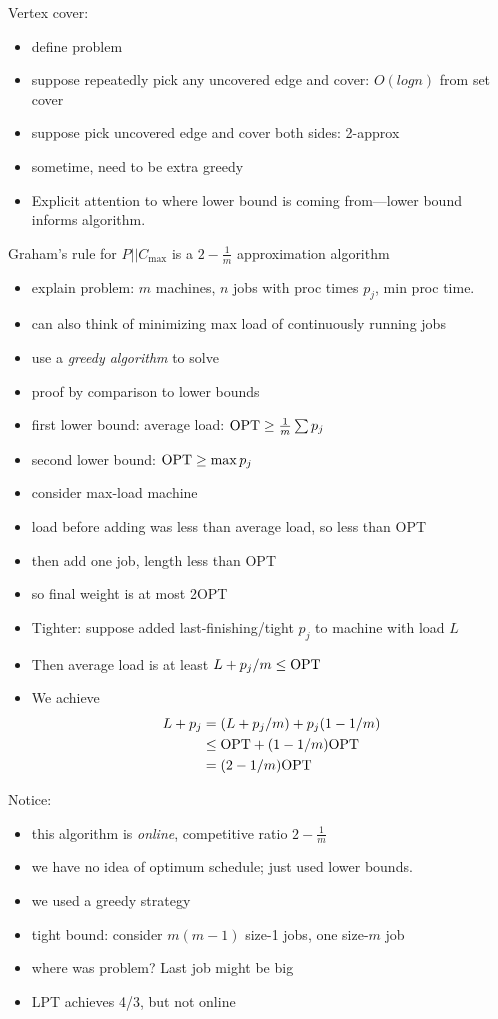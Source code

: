 \documentclass{article}
\begin{document}
Vertex cover:
\begin{itemize}
\item define problem
\item suppose repeatedly pick any uncovered edge and cover: $O(log n)$
  from set cover
\item suppose pick uncovered edge and cover both sides: 2-approx
\item sometime, need to be extra greedy
\item Explicit attention to where lower bound is coming from---lower
  bound informs algorithm.
\end{itemize}


Graham's rule for $P||C_{\max}$ is a $2-\frac1m$ approximation algorithm
\begin{itemize}
\item explain problem: $m$ machines, $n$ jobs with proc times $p_j$,
  min proc time.
\item can also think of minimizing max load of continuously running jobs
\item use a \emph{greedy algorithm} to solve
\item proof by comparison to lower bounds
\item first lower bound: average load: ${\mbox{OPT}} \ge \frac1m\sum p_j$
\item second lower bound:  ${\mbox{OPT}} \ge \max p_j$
\item consider max-load machine
\item load before adding was less than average load, so less than OPT
\item then add one job, length less than OPT
\item so final weight is at most 2OPT
\item Tighter: suppose added last-finishing/tight $p_j$ to machine with load $L$
\item Then average load is at least $L+p_j/m \le {\mbox{OPT}}$
\item We achieve 
\begin{align*}
L+p_j &= (L+p_j/m) + p_j(1-1/m)\\
&\le {\mbox{OPT}}+(1-1/m){\mbox{OPT}}\\
&=(2-1/m){\mbox{OPT}}
\end{align*}
\end{itemize}
Notice:
\begin{itemize}
\item this algorithm is \emph{online}, competitive ratio $2-\frac1m$
\item we have no idea of optimum schedule; just used lower bounds.
\item we used a greedy strategy
\item tight bound: consider $m(m-1)$ size-1 jobs, one size-$m$ job
\item where was problem? Last job might be big
\item LPT achieves 4/3, but not online
\end{itemize}
\end{document}
